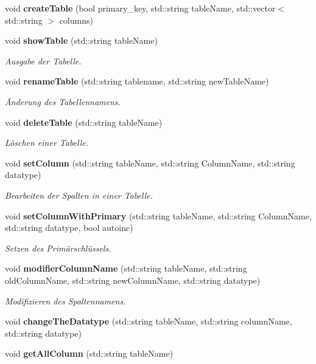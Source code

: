 \begin{DoxyCompactItemize}
\item 
void \textbf{ create\+Table} (bool primary\+\_\+key, std\+::string table\+Name, std\+::vector$<$ std\+::string $>$ columns)
\item 
void \textbf{ show\+Table} (std\+::string table\+Name)
\begin{DoxyCompactList}\small\item\em Ausgabe der Tabelle. \end{DoxyCompactList}\item 
void \textbf{ rename\+Table} (std\+::string tablename, std\+::string new\+Table\+Name)
\begin{DoxyCompactList}\small\item\em Änderung des Tabellennamens. \end{DoxyCompactList}\item 
void \textbf{ delete\+Table} (std\+::string table\+Name)
\begin{DoxyCompactList}\small\item\em Löschen einer Tabelle. \end{DoxyCompactList}\item 
void \textbf{ set\+Column} (std\+::string table\+Name, std\+::string Column\+Name, std\+::string datatype)
\begin{DoxyCompactList}\small\item\em Bearbeiten der Spalten in einer Tabelle. \end{DoxyCompactList}\item 
void \textbf{ set\+Column\+With\+Primary} (std\+::string table\+Name, std\+::string Column\+Name, std\+::string datatype, bool autoinc)
\begin{DoxyCompactList}\small\item\em Setzen des Primärschlüssels. \end{DoxyCompactList}\item 
void \textbf{ modifier\+Column\+Name} (std\+::string table\+Name, std\+::string old\+Column\+Name, std\+::string new\+Column\+Name, std\+::string datatype)
\begin{DoxyCompactList}\small\item\em Modifizieren des Spaltennamens. \end{DoxyCompactList}\item 
void \textbf{ change\+The\+Datatype} (std\+::string table\+Name, std\+::string column\+Name, std\+::string datatype)
\item 
void \textbf{ get\+All\+Column} (std\+::string table\+Name)

\end{DoxyCompactItemize}
